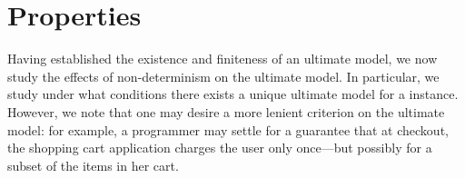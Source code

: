 \section{Properties}
\label{sec:properties}



Having established the existence and finiteness of an ultimate model, we now
study the effects of non-determinism on the ultimate model.  In particular, we
study under what conditions there exists a unique ultimate model for a \lang
instance.  However, we note that one may desire a more lenient criterion on the
ultimate model: for example, a programmer may settle for a guarantee that at
checkout, the shopping cart application charges the user only once---but
possibly for a subset of the items in her cart.




